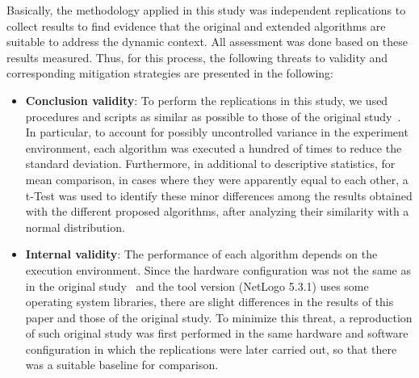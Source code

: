 
Basically, the methodology applied in this study was independent replications to collect results to find evidence that the original and extended algorithms are suitable to address the dynamic context. All assessment was done based on these results measured. Thus, for this process, the following threats to validity and corresponding mitigation strategies are presented in the following: 

\begin{itemize}
   \item \textbf{Conclusion validity}: To perform the replications in this study, we used procedures and scripts as similar as possible to those of the original study~\citep{MAS07}. In particular, to account for possibly uncontrolled variance in the experiment environment, each algorithm was executed a hundred of times to reduce the standard deviation. Furthermore, in additional to descriptive statistics, for mean comparison, in cases where they were apparently equal to each other, a t-Test was used to identify these minor differences among the results obtained with the different proposed algorithms, after analyzing their similarity with a normal distribution.
   
   
   \item \textbf{Internal validity}: The performance of each algorithm depends on the execution environment. Since the hardware configuration was not the same as in the original study~\citep{MAS07} and the tool version (NetLogo 5.3.1) uses some operating system libraries, there are slight differences in the results of this paper and those of the original study. To minimize this threat, a reproduction of such original study was first performed in the same hardware and software configuration in which the replications were later carried out, so that there was a suitable baseline for comparison.
   

\end{itemize}
